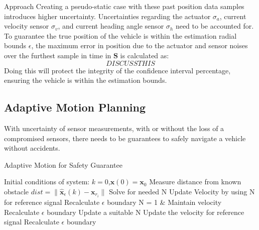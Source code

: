 \begin{section}{Approach}
Creating a pseudo-static case with these past position data samples introduces higher uncertainty. Uncertainties regarding the actuator $\sigma_a$, current velocity sensor $\sigma_v$, and current heading angle sensor $\sigma_h$ need to be accounted for. To guarantee the true position of the vehicle is within the estimation radial bounds $\epsilon$, the maximum error in position due to the actuator and sensor noises over the furthest sample in time in $\mathcal{\bm{S}}$ is calculated as:
    \begin{equation}
	DISCUSS THIS
	\end{equation}
Doing this will protect the integrity of the confidence interval percentage, ensuring the vehicle is within the estimation bounds.


\subsection{Adaptive Motion Planning}
With uncertainty of sensor measurements, with or without the loss of a compromised sensors, there needs to be guarantees to safely navigate a vehicle without accidents.



\begin{algorithm}
   \caption{Adaptive Motion for Safety Guarantee} 
   \label{alg:adapt_motion} 
    \begin{algorithmic}[1]
	\State Initial conditions of system: $k=0$,$\bm{x}(0)=\bm{x}_0$
        \State Measure distance from known obstacle $dist =\|\hat{\bm{x}}_\epsilon(k)-\bm{x}_{r_i}\|$
            \State Solve for needed N
            \State Update Velocity by using N for reference signal
            \State Recalculate $\epsilon$ boundary
        \Else
                \State N = 1 & Maintain velocity
                \State Recalculate $\epsilon$ boundary
            \Else
                \State Update a suitable N
                \State Update the velocity for reference signal
                \State Recalculate $\epsilon$ boundary
            \EndIf
        \EndIf
    \EndWhile
	\end{algorithmic}
\end{algorithm}



\end{section} 